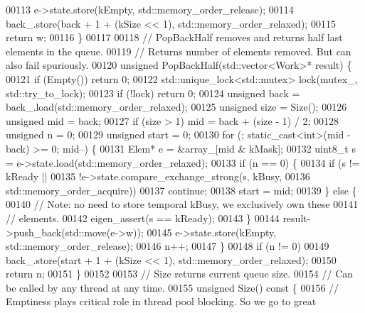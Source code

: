 \begin{DoxyCode}
00113     e->state.store(kEmpty, std::memory\_order\_release);
00114     back\_.store(back + 1 + (kSize << 1), std::memory\_order\_relaxed);
00115     \textcolor{keywordflow}{return} w;
00116   \}
00117 
00118   \textcolor{comment}{// PopBackHalf removes and returns half last elements in the queue.}
00119   \textcolor{comment}{// Returns number of elements removed. But can also fail spuriously.}
00120   \textcolor{keywordtype}{unsigned} PopBackHalf(std::vector<Work>* result) \{
00121     \textcolor{keywordflow}{if} (Empty()) \textcolor{keywordflow}{return} 0;
00122     std::unique\_lock<std::mutex> lock(mutex\_, std::try\_to\_lock);
00123     \textcolor{keywordflow}{if} (!lock) \textcolor{keywordflow}{return} 0;
00124     \textcolor{keywordtype}{unsigned} back = back\_.load(std::memory\_order\_relaxed);
00125     \textcolor{keywordtype}{unsigned} size = Size();
00126     \textcolor{keywordtype}{unsigned} mid = back;
00127     \textcolor{keywordflow}{if} (size > 1) mid = back + (size - 1) / 2;
00128     \textcolor{keywordtype}{unsigned} n = 0;
00129     \textcolor{keywordtype}{unsigned} start = 0;
00130     \textcolor{keywordflow}{for} (; \textcolor{keyword}{static\_cast<}\textcolor{keywordtype}{int}\textcolor{keyword}{>}(mid - back) >= 0; mid--) \{
00131       Elem* e = &array\_[mid & kMask];
00132       uint8\_t s = e->state.load(std::memory\_order\_relaxed);
00133       \textcolor{keywordflow}{if} (n == 0) \{
00134         \textcolor{keywordflow}{if} (s != kReady ||
00135             !e->state.compare\_exchange\_strong(s, kBusy,
00136                                               std::memory\_order\_acquire))
00137           \textcolor{keywordflow}{continue};
00138         start = mid;
00139       \} \textcolor{keywordflow}{else} \{
00140         \textcolor{comment}{// Note: no need to store temporal kBusy, we exclusively own these}
00141         \textcolor{comment}{// elements.}
00142         eigen\_assert(s == kReady);
00143       \}
00144       result->push\_back(std::move(e->w));
00145       e->state.store(kEmpty, std::memory\_order\_release);
00146       n++;
00147     \}
00148     \textcolor{keywordflow}{if} (n != 0)
00149       back\_.store(start + 1 + (kSize << 1), std::memory\_order\_relaxed);
00150     \textcolor{keywordflow}{return} n;
00151   \}
00152 
00153   \textcolor{comment}{// Size returns current queue size.}
00154   \textcolor{comment}{// Can be called by any thread at any time.}
00155   \textcolor{keywordtype}{unsigned} Size()\textcolor{keyword}{ const }\{
00156     \textcolor{comment}{// Emptiness plays critical role in thread pool blocking. So we go to great}

\end{DoxyCode}

